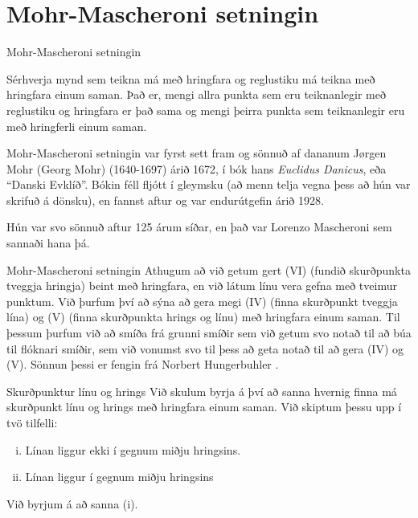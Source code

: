 \section{Mohr-Mascheroni setningin}
\begin{frame}{Mohr-Mascheroni setningin}
\begin{setn}
Sérhverja mynd
 sem teikna má með hringfara og reglustiku má teikna
með hringfara einum saman. Það er, mengi allra punkta sem eru teiknanlegir með
reglustiku og hringfara er það sama og mengi þeirra punkta sem teiknanlegir eru
með hringferli einum saman.
\end{setn}
\end{frame}

Mohr-Mascheroni setningin var fyrst sett fram og sönnuð af 
dananum Jørgen Mohr (Georg Mohr) (1640-1697) árið 1672, í bók hans
\emph{Euclidus Danicus}, eða ``Danski Evklíð''. Bókin féll fljótt í gleymsku
(að menn telja vegna þess að hún var skrifuð á dönsku), en fannst aftur og
var endurútgefin árið 1928.

Hún var svo sönnuð aftur %
125 árum síðar, en það var Lorenzo Mascheroni sem sannaði hana þá.

\begin{frame}{Mohr-Mascheroni setningin}
  Athugum að við getum gert (VI) (fundið skurðpunkta
  tveggja hringja) beint með hringfara, en við látum línu vera gefna með
  tveimur punktum. Við þurfum því að sýna að gera megi (IV) (finna skurðpunkt
  tveggja lína) og (V) (finna skurðpunkta hrings og línu) með hringfara einum saman.
    Til þessum þurfum við að smíða frá grunni smíðir sem við getum svo notað til að
    búa til flóknari smíðir, sem við vonumst svo til þess að geta notað til að gera
    (IV) og (V). Sönnun þessi er fengin frá Norbert Hungerbuhler \cite{Hungerbuhler}.
\end{frame}

\begin{frame}{Skurðpunktur línu og hrings}
Við skulum byrja á því að sanna hvernig finna má skurðpunkt
línu og hrings með hringfara einum saman.
Við skiptum þessu upp í tvö tilfelli:
\begin{enumerate}[(i)]
\item Línan liggur ekki í gegnum miðju hringsins.
\item  Línan liggur í gegnum miðju hringsins
\end{enumerate}
Við byrjum á að sanna (i).
\end{frame}

